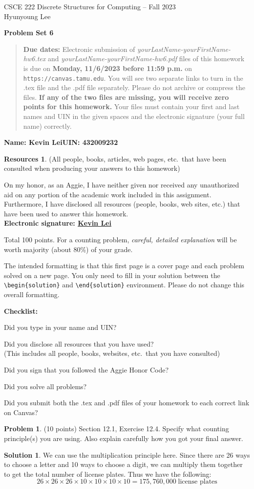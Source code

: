 \documentclass{article}
\theoremstyle{definition}
\newtheorem{problem}{Problem}
\newtheorem*{solution}{Solution}
\newtheorem*{resources}{Resources}
\newcommand{\name}[2]{\noindent\textbf{Name: #1}\hfill \textbf{UIN: #2}
  \newcommand{\myName}{#1}
  \newcommand{\myUIN}{#2}
}
\newcommand{\honor}{\noindent On my honor, as an Aggie, I have neither
  given nor received any unauthorized aid on any portion of the
  academic work included in this assignment. Furthermore, I have
  disclosed all resources (people, books, web sites, etc.) that have
  been used to answer this homework. \\[2ex]
 \textbf{Electronic signature: \underline{Kevin Lei} } } %
\newcommand{\checklist}{\noindent\textbf{Checklist:}
\begin{compactitem}[$\Box$] 
\item Did you type in your name and UIN? 
\item Did you disclose all resources that you have used? \\
(This includes all people, books, websites, etc.\ that you have consulted)
\item Did you sign that you followed the Aggie Honor Code? 
\item Did you solve all problems? 
\item Did you submit both the .tex and .pdf files of your homework to each correct link on Canvas? 
\end{compactitem}
}
\newcommand{\problemset}[1]{\begin{center}\textbf{Problem Set #1}\end{center}}
\newcommand{\duedate}[1]{\begin{quote}\textbf{Due dates:} Electronic
    submission of \textsl{yourLastName-yourFirstName-hw6.tex} and 
    \textsl{yourLastName-yourFirstName-hw6.pdf} files of this homework is due on
    \textbf{#1} on \texttt{https://canvas.tamu.edu}. You will see two separate links
    to turn in the .tex file and the .pdf file separately. Please do not archive or compress the files.  
    \textbf{If any of the two files are missing, you will receive zero points for this homework.}
    Your files must contain your first and last names and UIN in the given spaces and
    the electronic signature (your full name) correctly.\end{quote} }
\begin{document}
\begin{center}
{\large
CSCE 222 Discrete Structures for Computing -- Fall 2023\\[.5ex]
Hyunyoung Lee\\}
\end{center}
\problemset{6}
\duedate{Monday, 11/6/2023 before 11:59 p.m.}
\name{Kevin Lei}{432009232} %

\begin{resources} (All people, books, articles, web pages, etc.\ that
  have been consulted when producing your answers to this homework)
\end{resources}
\honor

\bigskip

\noindent
Total 100 points.  
For a counting problem, \textit{careful, detailed explanation} will be worth majority (about 80\%) 
of your grade.

\bigskip

\noindent
The intended formatting is that this first page is a cover page and each 
problem solved on a new page. You only need to fill in your solution between 
the \verb|\begin{solution}| and \verb|\end{solution}| environment.  
Please do not change this overall formatting.

\vfill
\checklist

\newpage
\begin{problem} (10 points) Section 12.1, Exercise 12.4.  Specify what counting principle(s)
you are using.  Also explain carefully how you got your final answer.
\end{problem}
\begin{solution}
We can use the multiplication principle here. 
Since there are 26 ways to choose a letter and 10 ways to choose a digit, we can multiply them together to get the total number of license plates.
Thus we have the following:
$$ 26 \times 26 \times 26 \times 10 \times 10 \times 10 \times 10 = 175,760,000 \; \text{license plates} $$
\end{solution}
\end{document}
